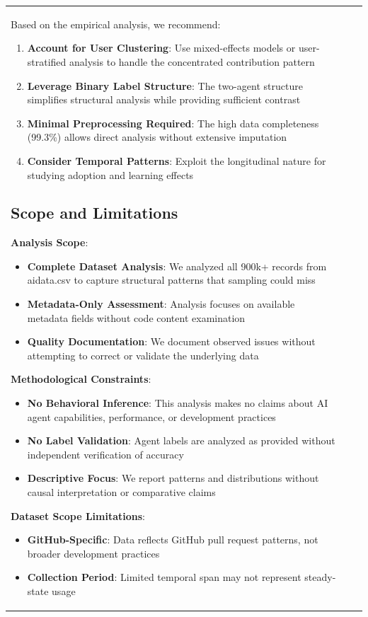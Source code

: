 \documentclass[conference]{IEEEtran}
\begin{document}
\begin{table}[t]
\begin{tabular}{@{}lrr@{}}
Based on the empirical analysis, we recommend:

\begin{enumerate}
    \item \textbf{Account for User Clustering}: Use mixed-effects models or user-stratified analysis to handle the concentrated contribution pattern
    \item \textbf{Leverage Binary Label Structure}: The two-agent structure simplifies structural analysis while providing sufficient contrast
    \item \textbf{Minimal Preprocessing Required}: The high data completeness (99.3\%) allows direct analysis without extensive imputation
    \item \textbf{Consider Temporal Patterns}: Exploit the longitudinal nature for studying adoption and learning effects
\end{enumerate}

\subsection{Scope and Limitations}

\textbf{Analysis Scope}:
\begin{itemize}
    \item \textbf{Complete Dataset Analysis}: We analyzed all 900k+ records from aidata.csv to capture structural patterns that sampling could miss
    \item \textbf{Metadata-Only Assessment}: Analysis focuses on available metadata fields without code content examination
    \item \textbf{Quality Documentation}: We document observed issues without attempting to correct or validate the underlying data
\end{itemize}

\textbf{Methodological Constraints}:
\begin{itemize}
    \item \textbf{No Behavioral Inference}: This analysis makes no claims about AI agent capabilities, performance, or development practices
    \item \textbf{No Label Validation}: Agent labels are analyzed as provided without independent verification of accuracy
    \item \textbf{Descriptive Focus}: We report patterns and distributions without causal interpretation or comparative claims
\end{itemize}

\textbf{Dataset Scope Limitations}:
\begin{itemize}
    \item \textbf{GitHub-Specific}: Data reflects GitHub pull request patterns, not broader development practices
    \item \textbf{Collection Period}: Limited temporal span may not represent steady-state usage


\end{itemize}
\end{tabular}
\end{table}
\end{document}
